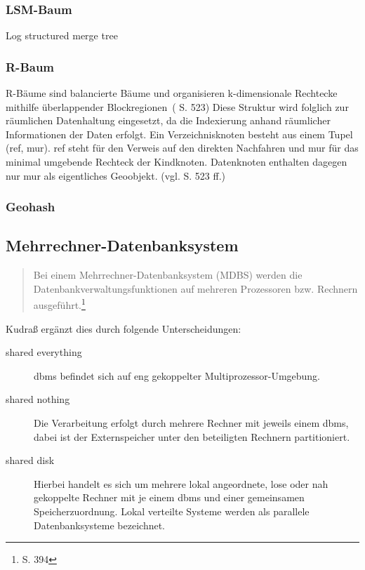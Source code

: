 \subsubsection{LSM-Baum}
Log structured merge tree

\subsubsection{R-Baum}
R-Bäume sind balancierte Bäume und \glqq organisieren k-dimensionale Rechtecke mithilfe überlappender Blockregionen\grqq \ (\cite{book:kudrass} S. 523)
Diese Struktur wird folglich zur räumlichen Datenhaltung eingesetzt, da die Indexierung anhand räumlicher Informationen der Daten erfolgt.
Ein Verzeichnisknoten besteht aus einem Tupel (ref, mur).
ref steht für den Verweis auf den direkten Nachfahren und mur für das minimal umgebende Rechteck der Kindknoten.
Datenknoten enthalten dagegen nur mur als eigentliches Geoobjekt. (vgl. \cite{book:kudrass} S. 523 ff.)

\subsubsection{Geohash}
\label{geohash}

\subsection{Mehrrechner-Datenbanksystem}

\begin{quote}
Bei einem Mehrrechner-Datenbanksystem (MDBS) werden die Datenbankverwaltungsfunktionen auf mehreren Prozessoren bzw. Rechnern ausgeführt.\footnote{\cite{book:kudrass} S. 394}
\end{quote}
Kudraß ergänzt dies durch folgende Unterscheidungen:
\begin{description}
\item[shared everything] \Gls{dbms} befindet sich auf eng gekoppelter Multiprozessor-Umgebung.
\item[shared nothing] Die Verarbeitung erfolgt durch mehrere Rechner mit jeweils einem \Gls{dbms}, dabei ist der Externspeicher unter den beteiligten Rechnern partitioniert.
\item[shared disk] Hierbei handelt es sich um mehrere lokal angeordnete, lose oder nah gekoppelte Rechner mit je einem \Gls{dbms} und einer gemeinsamen Speicherzuordnung. Lokal verteilte Systeme werden als parallele Datenbanksysteme bezeichnet.
\end{description}


